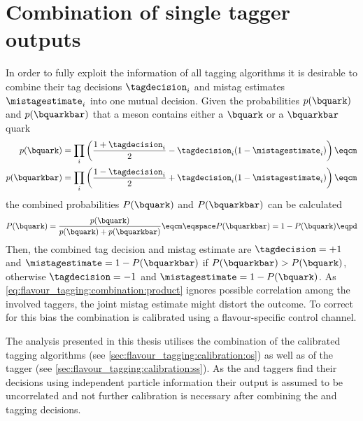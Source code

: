 \section{Combination of single tagger outputs}
\label{sec:flavour_tagging:combination}

In order to fully exploit the information of all tagging algorithms it is
desirable to combine their tag decisions $\tagdecision_i$ and mistag estimates
$\mistagestimate_i$ into one mutual decision. Given the probabilities
$p(\bquark)$ and $p(\bquarkbar)$ that a meson contains either a $\bquark$ or a
$\bquarkbar$ quark
%
\begin{equation}\label{eq:flavour_tagging:combination:product}
  \begin{split}
    p(\bquark)    &= \prod_i\left( \frac{1 + \tagdecision_i}{2} - \tagdecision_i (1 - \mistagestimate_i) \right)\eqcm\\
    p(\bquarkbar) &= \prod_i\left( \frac{1 - \tagdecision_i}{2} + \tagdecision_i (1 - \mistagestimate_i) \right)\eqcm
  \end{split}
\end{equation}
%
the combined probabilities $P(\bquark)$ and $P(\bquarkbar)$ can be calculated
%
\begin{equation}\label{eq:flavour_tagging:combination:total}
  P(\bquark)    = \frac{p(\bquark)}{p(\bquark) + p(\bquarkbar)}\eqcm\eqspace
  P(\bquarkbar) = 1 - P(\bquark)\eqpd
\end{equation}
%
Then, the combined tag decision and mistag estimate are $\tagdecision = +1$ and
$\mistagestimate = 1 - P(\bquarkbar)$ if $P(\bquarkbar) > P(\bquark)$, otherwise
$\tagdecision = -1$ and $\mistagestimate = 1 - P(\bquark)$. As
\cref{eq:flavour_tagging:combination:product} ignores possible correlation among
the involved taggers, the joint mistag estimate might distort the outcome. To
correct for this bias the combination is calibrated using a flavour-specific
control channel.

The analysis presented in this thesis utilises the combination of the calibrated
\OS tagging algorithms (see \cref{sec:flavour_tagging:calibration:os}) as well
as of the \SSpi tagger (see \cref{sec:flavour_tagging:calibration:ss}). As the
\OS and \SS taggers find their decisions using independent particle information
their output is assumed to be uncorrelated and not further calibration is
necessary after combining the \OS and \SSpi tagging decisions.

